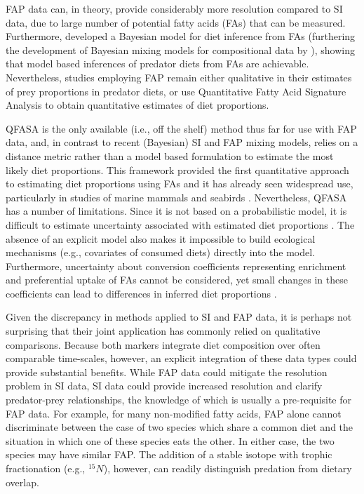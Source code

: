 \documentclass{article}%
\begin{document}
\begin{spacing}{1.9}
\begin{flushleft}
FAP data can, in theory, provide considerably more resolution compared
to SI data, due to large number of potential fatty acids (FAs) that can be
measured. Furthermore, \citet{blanchard_inference_2011} developed a
Bayesian model for diet inference from FAs (furthering the
development of Bayesian mixing models for compositional data by
\citet{billheimer_compositional_2001}), showing that model based
inferences of predator diets from FAs are
achievable. Nevertheless, studies employing FAP remain either qualitative
in their estimates of prey proportions in predator diets, or use
Quantitative Fatty Acid Signature Analysis \citep[QFASA; ][]{iverson_quantitative_2004} to
obtain quantitative estimates of diet proportions. 

QFASA is the only available (i.e., off the shelf) method thus far for use with FAP data, and, in
contrast to recent (Bayesian) SI and FAP mixing models, relies on a distance
metric rather than a model based formulation to estimate the most
likely diet proportions. This framework provided the first
quantitative approach to estimating diet proportions using FAs
and it has already seen widespread use, particularly in studies of
marine mammals \citep{bowen_methods_2012} and seabirds
\citep{williams_using_2010}. Nevertheless, QFASA has a number of
limitations. Since it is not based on a probabilistic model, it is
difficult to estimate uncertainty associated with estimated diet
proportions \citep[but see Steward 2005 as cited in][]{blanchard_inference_2011}. The absence of an explicit model
also makes it impossible to build ecological mechanisms (e.g.,
covariates of consumed diets) directly into the model. Furthermore,
uncertainty about conversion coefficients representing enrichment and
preferential uptake of FAs cannot be considered, yet small
changes in these coefficients can lead to differences in inferred diet
proportions \citep{wang_validating_2010}.

Given the discrepancy in methods applied to SI and FAP data, it is
perhaps not surprising that their joint application has commonly
relied on qualitative comparisons. Because both markers integrate diet
composition over often comparable time-scales, however, an explicit
integration of these data types could provide substantial
benefits. While FAP data could mitigate the resolution problem in SI
data, SI data could provide increased resolution and clarify
predator-prey relationships, the knowledge of which is usually a
pre-requisite for FAP data. For example, for many non-modified fatty
acids, FAP alone cannot discriminate between the case of two species
which share a common diet and the situation in which one of these
species eats the other.  In either case, the two species may have
similar FAP. The addition of a stable isotope with trophic
fractionation (e.g., $^{15}N$), however, can readily distinguish predation
from dietary overlap.


\end{flushleft}
\end{spacing}
\end{document}
